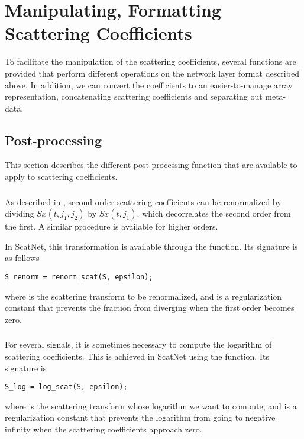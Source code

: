 \documentclass{article}
\begin{document}
\section{Manipulating, Formatting Scattering Coefficients \label{sec:utilities}}

To facilitate the manipulation of the scattering coefficients, several functions are provided that perform different operations on the network layer format described above. In addition, we can convert the coefficients to an easier-to-manage array representation, concatenating scattering coefficients and separating out meta-data.

\subsection{Post-processing}

This section describes the different post-processing function that are available to apply to scattering coefficients.

\subsubsection{}
As described in \cite{joakim}, second-order scattering coefficients can be renormalized by dividing $Sx(t,j_1,j_2)$ by $Sx(t,j_1)$, which decorrelates the second order from the first. A similar procedure is available for higher orders.

In ScatNet, this transformation is available through the  function. Its signature is as follows
\begin{lstlisting}
S_renorm = renorm_scat(S, epsilon);
\end{lstlisting}
where  is the scattering transform to be renormalized, and  is a regularization constant that prevents the fraction from diverging when the first order becomes zero.

\subsubsection{}
For several signals, it is sometimes necessary to compute the logarithm of scattering coefficients. This is achieved in ScatNet using the  function. Its signature is
\begin{lstlisting}
S_log = log_scat(S, epsilon);
\end{lstlisting}
where  is the scattering transform whose logarithm we want to compute, and  is a regularization constant that prevents the logarithm from going to negative infinity when the scattering coefficients approach zero.
\end{document}
